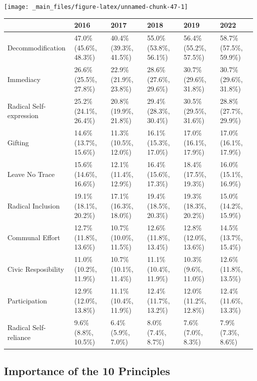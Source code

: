 \documentclass[
]{book}
\begin{document}
\texttt{[image: \_main\_files/figure-latex/unnamed-chunk-47-1]}

\begin{table}
\centering
\begin{tabular}[t]{>{}l|>{}l|>{}l|>{}l|>{}l|>{}l}
\hline
  & 2016 & 2017 & 2018 & 2019 & 2022\\
\hline
Decommodification & 47.0\% (45.6\%, 48.3\%) & 40.4\% (39.3\%, 41.5\%) & 55.0\% (53.8\%, 56.1\%) & 56.4\% (55.2\%, 57.5\%) & 58.7\% (57.5\%, 59.9\%)\\
\hline
Immediacy & 26.6\% (25.5\%, 27.8\%) & 22.9\% (21.9\%, 23.8\%) & 28.6\% (27.6\%, 29.6\%) & 30.7\% (29.6\%, 31.8\%) & 30.7\% (29.6\%, 31.8\%)\\
\hline
Radical Self-expression & 25.2\% (24.1\%, 26.4\%) & 20.8\% (19.9\%, 21.8\%) & 29.4\% (28.3\%, 30.4\%) & 30.5\% (29.5\%, 31.6\%) & 28.8\% (27.7\%, 29.9\%)\\
\hline
Gifting & 14.6\% (13.7\%, 15.6\%) & 11.3\% (10.5\%, 12.0\%) & 16.1\% (15.3\%, 17.0\%) & 17.0\% (16.1\%, 17.9\%) & 17.0\% (16.1\%, 17.9\%)\\
\hline
Leave No Trace & 15.6\% (14.6\%, 16.6\%) & 12.1\% (11.4\%, 12.9\%) & 16.4\% (15.6\%, 17.3\%) & 18.4\% (17.5\%, 19.3\%) & 16.0\% (15.1\%, 16.9\%)\\
\hline
Radical Inclusion & 19.1\% (18.1\%, 20.2\%) & 17.1\% (16.3\%, 18.0\%) & 19.4\% (18.5\%, 20.3\%) & 19.3\% (18.3\%, 20.2\%) & 15.0\% (14.2\%, 15.9\%)\\
\hline
Communal Effort & 12.7\% (11.8\%, 13.6\%) & 10.7\% (10.0\%, 11.5\%) & 12.6\% (11.8\%, 13.4\%) & 12.8\% (12.0\%, 13.6\%) & 14.5\% (13.7\%, 15.4\%)\\
\hline
Civic Resposibility & 11.0\% (10.2\%, 11.9\%) & 10.7\% (10.1\%, 11.4\%) & 11.1\% (10.4\%, 11.9\%) & 10.3\% (9.6\%, 11.0\%) & 12.6\% (11.8\%, 13.5\%)\\
\hline
Participation & 12.9\% (12.0\%, 13.8\%) & 11.1\% (10.4\%, 11.9\%) & 12.4\% (11.7\%, 13.2\%) & 12.0\% (11.2\%, 12.8\%) & 12.4\% (11.6\%, 13.3\%)\\
\hline
Radical Self-reliance & 9.6\% (8.8\%, 10.5\%) & 6.4\% (5.9\%, 7.0\%) & 8.0\% (7.4\%, 8.7\%) & 7.6\% (7.0\%, 8.3\%) & 7.9\% (7.3\%, 8.6\%)\\
\hline
\end{tabular}
\end{table}

\hypertarget{importance-of-the-10-principles}{%
\subsection{Importance of the 10 Principles}\label{importance-of-the-10-principles}}
\end{document}
